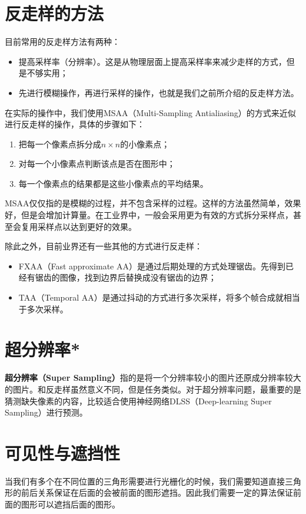 \documentclass[openany]{progbookcn}
\begin{document}
\section{反走样的方法}
目前常用的反走样方法有两种：
\begin{itemize}
	\item 提高采样率（分辨率）。这是从物理层面上提高采样率来减少走样的方式，但是不够实用；
	\item 先进行模糊操作，再进行采样的操作，也就是我们之前所介绍的反走样方法。
\end{itemize}
在实际的操作中，我们使用MSAA（Multi-Sampling Antialiasing）的方式来近似进行反走样的操作，具体的步骤如下：
\begin{enumerate}
	\item 把每一个像素点拆分成$n\times n$的小像素点；
	\item 对每一个小像素点判断该点是否在图形中；
	\item 每一个像素点的结果都是这些小像素点的平均结果。
\end{enumerate}
MSAA仅仅指的是模糊的过程，并不包含采样的过程。这样的方法虽然简单，效果好，但是会增加计算量。在工业界中，一般会采用更为有效的方式拆分采样点，甚至会复用采样点以达到更好的效果。

除此之外，目前业界还有一些其他的方式进行反走样：
\begin{itemize}
	\item FXAA（Fast approximate AA）是通过后期处理的方式处理锯齿。先得到已经有锯齿的图像，找到边界后替换成没有锯齿的边界；
	\item TAA（Temporal AA）是通过抖动的方式进行多次采样，将多个帧合成就相当于多次采样。
\end{itemize}

\section{超分辨率*}
\textbf{超分辨率（Super Sampling）}指的是将一个分辨率较小的图片还原成分辨率较大的图片。和反走样虽然意义不同，但是任务类似。对于超分辨率问题，最重要的是猜测缺失像素的内容，比较适合使用神经网络DLSS（Deep-learning Super Sampling）进行预测。

\section{可见性与遮挡性}
当我们有多个在不同位置的三角形需要进行光栅化的时候，我们需要知道直接三角形的前后关系保证在后面的会被前面的图形遮挡。因此我们需要一定的算法保证前面的图形可以遮挡后面的图形。
\end{document}
